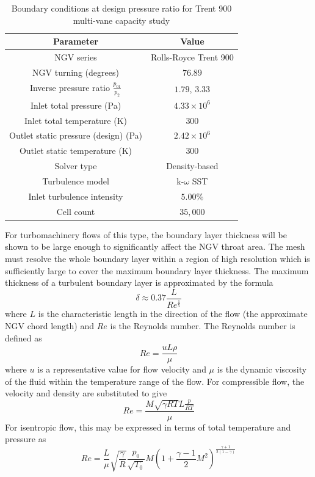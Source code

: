 \documentclass[a4paper, 11pt, oneside]{report}
\begin{document}
\begin{table}[H]
\caption{Boundary conditions at design pressure ratio for Trent 900 multi-vane capacity study}
\label{T900_parameters}
\begin{center}
\begin{tabular}{|c|c|}
\hline
Parameter & Value\\
\hline
NGV series & Rolls-Royce Trent 900\\
NGV turning (degrees) & $76.89$\\
Inverse pressure ratio $\frac{p_{01}}{p_2}$ & $1.79$, $3.33$\\
Inlet total pressure (Pa) & $4.33 \times 10^6$\\
Inlet total temperature (K) & $300$\\
Outlet static pressure (design) (Pa) & $2.42 \times 10^6$\\
Outlet static temperature (K) & $300$\\
Solver type & Density-based\\
Turbulence model & k-$\omega$ SST\\
Inlet turbulence intensity & $5.00\%$\\
Cell count & $35,000$\\
\hline
\end{tabular}
\end{center}
\end{table}

For turbomachinery flows of this type, the boundary layer thickness will be shown to be large enough to significantly affect the NGV throat area. The mesh must resolve the whole boundary layer within a region of high resolution which is sufficiently large to cover the maximum boundary layer thickness. The maximum thickness of a turbulent boundary layer is approximated by the formula
\begin{equation}\label{boundary_layer_thickness}
\delta \approx
0.37
\frac{L}{Re^\frac{1}{5}}
\end{equation}
where $L$ is the characteristic length in the direction of the flow (the approximate NGV chord length) and $Re$ is the Reynolds number. The Reynolds number is defined as
\begin{equation}
Re = 
\frac{uL\rho}{\mu}
\end{equation}
where $u$ is a representative value for flow velocity and $\mu$ is the dynamic viscosity of the fluid within the temperature range of the flow. For compressible flow, the velocity and density are substituted to give
\begin{equation}
Re = 
\frac{
	M\sqrt{\gamma RT}L\frac{p}{RT}
}{
	\mu
}
\end{equation}
For isentropic flow, this may be expressed in terms of total temperature and pressure as
\begin{equation}\label{reynolds_number_compressible}
Re = 
\frac{L}{\mu}
\sqrt{\frac{\gamma}{R}}
\frac{p_0}{\sqrt{T_0}}
M
\left(
	1 +
	\frac{\gamma-1}{2}
	M^2
\right)
^{\frac{\gamma+1}{2(1-\gamma)}}
\end{equation}
\end{document}
